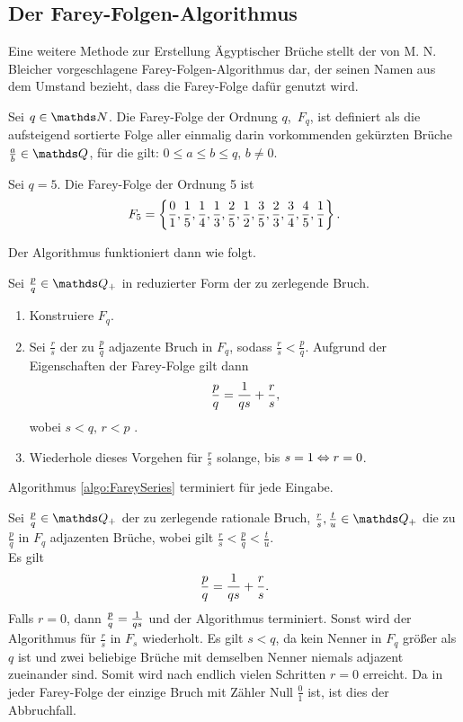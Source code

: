 \subsection{Der Farey-Folgen-Algorithmus}
Eine weitere Methode zur Erstellung Ägyptischer Brüche stellt der von M. N. Bleicher vorgeschlagene Farey-Folgen-Algorithmus dar, der seinen Namen aus dem Umstand bezieht, dass die Farey-Folge dafür genutzt wird. \cite[S. 88]{Guy1981}
\begin{def1}
	Sei $q \in \N$. Die Farey-Folge der Ordnung $q$, $\, F_q$, ist definiert als die aufsteigend sortierte Folge aller einmalig darin vorkommenden gekürzten Brüche $\frac{a}{b} \in \Q$, für die gilt:
	$0\leq a \leq b \leq q,\, b\neq 0$.
\end{def1}

\begin{bsp}
	Sei $q=5$. Die Farey-Folge der Ordnung 5 ist
	$$F_5 = \left\{\frac{0}{1}, \frac{1}{5}, \frac{1}{4}, \frac{1}{3}, \frac{2}{5}, \frac{1}{2}, \frac{3}{5}, \frac{2}{3}, \frac{3}{4}, \frac{4}{5}, \frac{1}{1} \right\}.$$
\end{bsp}

Der Algorithmus funktioniert dann wie folgt.
\begin{algorithm}\label{algo:FareySeries}
	Sei $\frac{p}{q} \in \Q_+$ in reduzierter Form der zu zerlegende Bruch.
	\begin{enumerate}
		\item Konstruiere $F_q$.
		\item Sei $\frac{r}{s}$ der zu $\frac{p}{q}$ adjazente Bruch in $F_q$, sodass $\frac{r}{s} < \frac{p}{q}$. Aufgrund der Eigenschaften der Farey-Folge gilt dann
		$$\frac{p}{q} = \frac{1}{qs} + \frac{r}{s},$$ wobei $s<q,\, r<p$ \cite[S. 425]{Beck2000}.
		\item Wiederhole dieses Vorgehen für $\frac{r}{s}$ solange, bis $s=1 \Leftrightarrow r=0$.
	\end{enumerate}
\end{algorithm}
\begin{satz}
	Algorithmus \ref{algo:FareySeries} terminiert für jede Eingabe.
\end{satz}
\begin{bew}
	Sei $\frac{p}{q} \in \Q_+$ der zu zerlegende rationale Bruch, $\frac{r}{s}, \frac{t}{u} \in \Q_+$ die zu $\frac{p}{q}$ in $F_q$ adjazenten Brüche, wobei gilt $\frac{r}{s}<\frac{p}{q} < \frac{t}{u}$.\\
	Es gilt $$\frac{p}{q} = \frac{1}{qs}+\frac{r}{s}.$$
	Falls $r = 0$, dann $\frac{p}{q} = \frac{1}{qs}$ und der Algorithmus terminiert.
	Sonst wird der Algorithmus für $\frac{r}{s}$ in $F_s$ wiederholt. Es gilt $s<q$, da kein Nenner in $F_q$ größer als $q$ ist und zwei beliebige Brüche mit demselben Nenner niemals adjazent zueinander sind. Somit wird nach endlich vielen Schritten $r=0$ erreicht. Da in jeder Farey-Folge der einzige Bruch mit Zähler Null $\frac{0}{1}$ ist, ist dies der Abbruchfall.
\end{bew}

